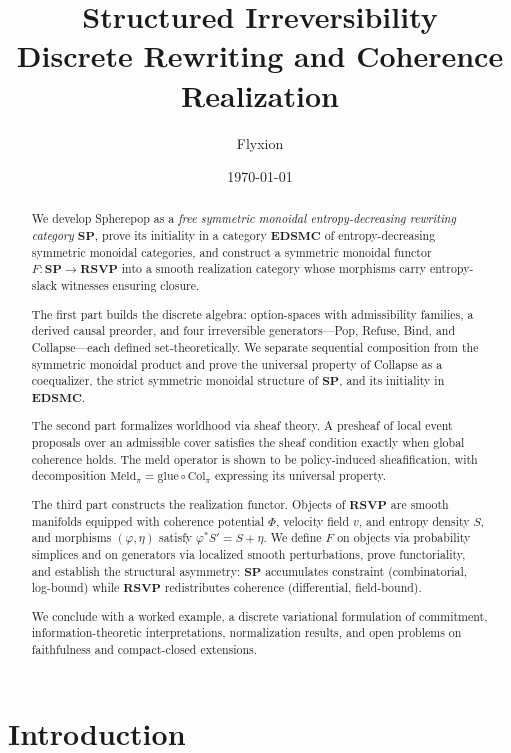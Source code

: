 \documentclass[12pt,a4paper]{article}
\title{\textbf{Structured Irreversibility}\\
\large Discrete Rewriting and Coherence Realization}
\author{Flyxion}
\date{\today}
\theoremstyle{definition}
\theoremstyle{remark}
\newcommand{\SP}{\mathbf{SP}}
\newcommand{\RSVP}{\mathbf{RSVP}}
\newcommand{\EDSMC}{\mathbf{EDSMC}}
\newcommand{\Col}{\mathrm{Col}}
\newcommand{\Meld}{\mathrm{Meld}}
\newcommand{\PhiF}{\Phi}
\newcommand{\vF}{v}
\newcommand{\SF}{S}
\begin{document}
\maketitle
\begin{abstract}
We develop Spherepop as a \emph{free symmetric monoidal entropy-decreasing rewriting
category} $\SP$, prove its initiality in a category $\EDSMC$ of entropy-decreasing
symmetric monoidal categories, and construct a symmetric monoidal functor
$F:\SP\to\RSVP$ into a smooth realization category whose morphisms carry
entropy-slack witnesses ensuring closure.

The first part builds the discrete algebra: option-spaces with admissibility
families, a derived causal preorder, and four irreversible generators—Pop,
Refuse, Bind, and Collapse—each defined set-theoretically. We separate
sequential composition from the symmetric monoidal product and prove the
universal property of Collapse as a coequalizer, the strict symmetric monoidal
structure of $\SP$, and its initiality in $\EDSMC$.

The second part formalizes worldhood via sheaf theory. A presheaf of local
event proposals over an admissible cover satisfies the sheaf condition exactly
when global coherence holds. The meld operator is shown to be policy-induced
sheafification, with decomposition $\Meld_\pi=\mathrm{glue}\circ\Col_\pi$
expressing its universal property.

The third part constructs the realization functor. Objects of $\RSVP$ are
smooth manifolds equipped with coherence potential $\PhiF$, velocity field
$\vF$, and entropy density $\SF$, and morphisms $(\varphi,\eta)$ satisfy
$\varphi^*\SF'=\SF+\eta$. We define $F$ on objects via probability simplices
and on generators via localized smooth perturbations, prove functoriality,
and establish the structural asymmetry: $\SP$ accumulates constraint
(combinatorial, log-bound) while $\RSVP$ redistributes coherence
(differential, field-bound).

We conclude with a worked example, a discrete variational formulation of
commitment, information-theoretic interpretations, normalization results,
and open problems on faithfulness and compact-closed extensions.
\end{abstract}

\tableofcontents
\newpage

\section{Introduction}
\label{sec:intro}
\end{document}
